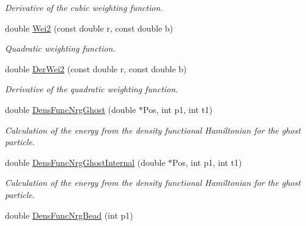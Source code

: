 \begin{DoxyCompactItemize}
\begin{DoxyCompactList}\small\item\em \-Derivative of the cubic weighting function. \end{DoxyCompactList}\item 
\hypertarget{classForces_a2a275bbffe53c778eb8d535f3dc601f8}{double \hyperlink{classForces_a2a275bbffe53c778eb8d535f3dc601f8}{\-Wei2} (const double r, const double b)}\label{classForces_a2a275bbffe53c778eb8d535f3dc601f8}

\begin{DoxyCompactList}\small\item\em \-Quadratic weighting function. \end{DoxyCompactList}\item 
\hypertarget{classForces_a5c07d0e26deb83592ec816a9d6dfd05b}{double \hyperlink{classForces_a5c07d0e26deb83592ec816a9d6dfd05b}{\-Der\-Wei2} (const double r, const double b)}\label{classForces_a5c07d0e26deb83592ec816a9d6dfd05b}

\begin{DoxyCompactList}\small\item\em \-Derivative of the quadratic weighting function. \end{DoxyCompactList}\item 
\hypertarget{classForces_a6330de60f8b181b6e7ac68f9cd103f58}{double \hyperlink{classForces_a6330de60f8b181b6e7ac68f9cd103f58}{\-Dens\-Func\-Nrg\-Ghost} (double $\ast$\-Pos, int p1, int t1)}\label{classForces_a6330de60f8b181b6e7ac68f9cd103f58}

\begin{DoxyCompactList}\small\item\em \-Calculation of the energy from the density functional \-Hamiltonian for the ghost particle. \end{DoxyCompactList}\item 
\hypertarget{classForces_a75fb72ed9ede20a211933fe11dabebcf}{double \hyperlink{classForces_a75fb72ed9ede20a211933fe11dabebcf}{\-Dens\-Func\-Nrg\-Ghost\-Internal} (double $\ast$\-Pos, int p1, int t1)}\label{classForces_a75fb72ed9ede20a211933fe11dabebcf}

\begin{DoxyCompactList}\small\item\em \-Calculation of the energy from the density functional \-Hamiltonian for the ghost particle. \end{DoxyCompactList}\item 
\hypertarget{classForces_aaf00acd2a6784650ce2b34f2c802b6c4}{double \hyperlink{classForces_aaf00acd2a6784650ce2b34f2c802b6c4}{\-Dens\-Func\-Nrg\-Bead} (int p1)}\label{classForces_aaf00acd2a6784650ce2b34f2c802b6c4}


\end{DoxyCompactItemize}

